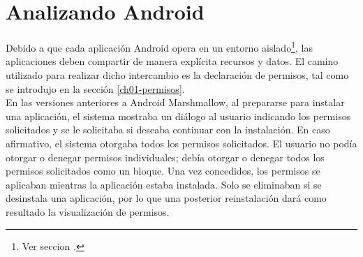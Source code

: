 \section{Analizando Android}
Debido a que cada aplicación Android opera en un entorno aislado\footnote{Ver seccion .}, las aplicaciones deben compartir de manera explícita recursos y datos. El camino utilizado para realizar dicho intercambio es la declaración de permisos, tal como se introdujo en la sección \ref{ch01-permisos}.\\
En las versiones anteriores a Android Marshmallow, al prepararse para instalar una aplicación, el sistema mostraba un diálogo al usuario indicando los permisos solicitados y se le solicitaba si deseaba continuar con la instalación. En caso afirmativo, el sistema otorgaba todos los permisos solicitados. El usuario no podía otorgar o denegar permisos individuales; debía otorgar o denegar todos los permisos solicitados como un bloque. Una vez concedidos, los permisos se aplicaban mientras la aplicación estaba instalada. Solo se eliminaban si se desinstala una aplicación, por lo que una posterior reinstalación dará como resultado la visualización de permisos.\\

